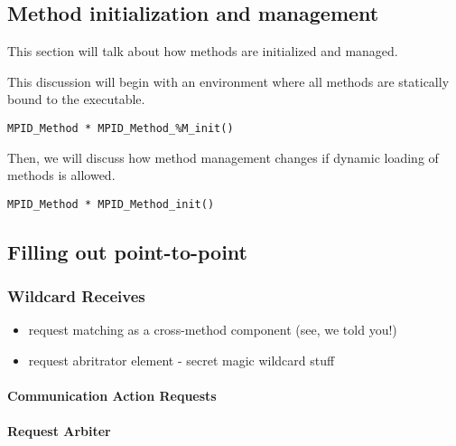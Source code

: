 \subsection{Method initialization and management}

This section will talk about how methods are initialized and managed.

This discussion will begin with an environment where all methods are
statically bound to the executable.

\begin{verbatim}
MPID_Method * MPID_Method_%M_init()
\end{verbatim}

Then, we will discuss how method management changes if dynamic
loading of methods is allowed.

\begin{verbatim}
MPID_Method * MPID_Method_init()
\end{verbatim}


\subsection{Filling out point-to-point}

\subsubsection{Wildcard Receives}
\begin{itemize}
  \item request matching as a cross-method component (see, we told you!)
  \item request abritrator element - secret magic wildcard stuff
\end{itemize}

\paragraph{Communication Action Requests}

\paragraph{Request Arbiter}

%

